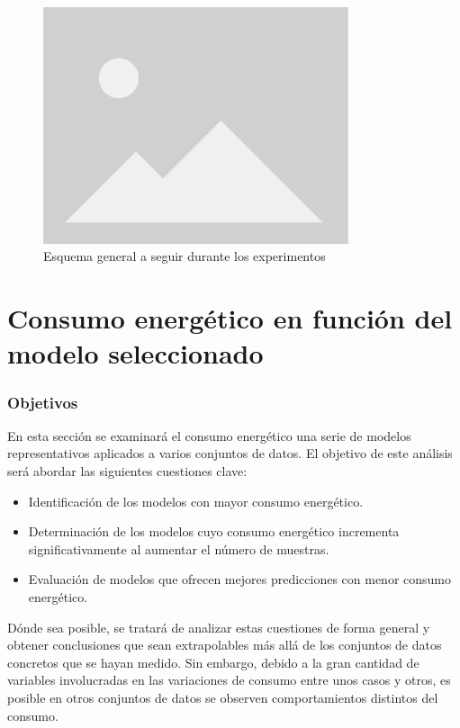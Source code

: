 \begin{figure}[H]
  \centerline{
     \includegraphics[width=0.8\textwidth, keepaspectratio]{img/placeholder.png}
  }
  \caption{Esquema general a seguir durante los experimentos}
  \label{fig:esquema-experimentos}
\end{figure}

\section{Consumo energético en función del modelo seleccionado}
\label{sec:test-1-models}

\subsubsection{Objetivos}

En esta sección se examinará el consumo energético una serie de modelos representativos aplicados a varios conjuntos de datos. El objetivo de este análisis será abordar las siguientes cuestiones clave:

\begin{itemize}
    \item Identificación de los modelos con mayor consumo energético.
    \item Determinación de los modelos cuyo consumo energético incrementa significativamente al aumentar el número de muestras.
    \item Evaluación de modelos que ofrecen mejores predicciones con menor consumo energético.
\end{itemize}

Dónde sea posible, se tratará de analizar estas cuestiones de forma general y obtener conclusiones que sean extrapolables más allá de los conjuntos de datos concretos que se hayan medido. Sin embargo, debido a la gran cantidad de variables involucradas en las variaciones de consumo entre unos casos y otros, es posible en otros conjuntos de datos se observen comportamientos distintos del consumo.

